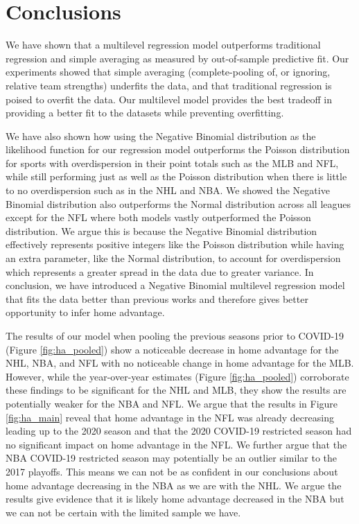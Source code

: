 \section*{Conclusions}

We have shown that a multilevel regression model outperforms traditional regression and simple averaging as measured by out-of-sample predictive fit. Our experiments showed that simple averaging (complete-pooling of, or ignoring, relative team strengths) underfits the data, and that traditional regression is poised to overfit the data. Our multilevel model provides the best tradeoff in providing a better fit to the datasets while preventing overfitting. 

We have also shown how using the Negative Binomial distribution as the likelihood function for our regression model outperforms the Poisson distribution for sports with overdispersion in their point totals such as the MLB and NFL, while still performing just as well as the Poisson distribution when there is little to no overdispersion such as in the NHL and NBA. We showed the Negative Binomial distribution also outperforms the Normal distribution across all leagues except for the NFL where both models vastly outperformed the Poisson distribution. We argue this is because the Negative Binomial distribution effectively represents positive integers like the Poisson distribution while having an extra parameter, like the Normal distribution, to account for overdispersion which represents a greater spread in the data due to greater variance. In conclusion, we have introduced a Negative Binomial multilevel regression model that fits the data better than previous works and therefore gives better opportunity to infer home advantage.

The results of our model when pooling the previous seasons prior to COVID-19 (Figure \mbox{\ref{fig:ha_pooled}}) show a noticeable decrease in home advantage for the NHL, NBA, and NFL with no noticeable change in home advantage for the MLB. However, while the year-over-year estimates (Figure \mbox{\ref{fig:ha_pooled}}) corroborate these findings to be significant for the NHL and MLB, they show the results are potentially weaker for the NBA and NFL. We argue that the results in Figure \mbox{\ref{fig:ha_main}} reveal that home advantage in the NFL was already decreasing leading up to the 2020 season and that the 2020 COVID-19 restricted season had no significant impact on home advantage in the NFL. We further argue that the NBA COVID-19 restricted season may potentially be an outlier similar to the 2017 playoffs. This means we can not be as confident in our conclusions about home advantage decreasing in the NBA as we are with the NHL. We argue the results give evidence that it is likely home advantage decreased in the NBA but we can not be certain with the limited sample we have.